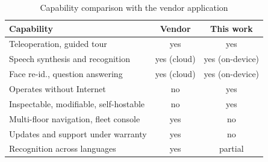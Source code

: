 %
\begin{table}[H]
\caption{Capability comparison with the vendor application}
\label{tab:compare}
\centering
\scriptsize
\setlength{\tabcolsep}{4pt}
\begin{tabular}{@{}lcc@{}}
\toprule
\textbf{Capability} & \textbf{Vendor} & \textbf{This work} \\
\midrule
Teleoperation, guided tour        & yes         & yes \\
Speech synthesis and recognition  & yes (cloud) & yes (on-device) \\
Face re-id., question answering   & yes (cloud) & yes (on-device) \\
Operates without Internet         & no          & yes \\
Inspectable, modifiable, self-hostable & no     & yes \\
\midrule
Multi-floor navigation, fleet console & yes     & no \\
Updates and support under warranty & yes        & no \\
Recognition across languages      & yes         & partial \\
\bottomrule
\end{tabular}
\end{table}
